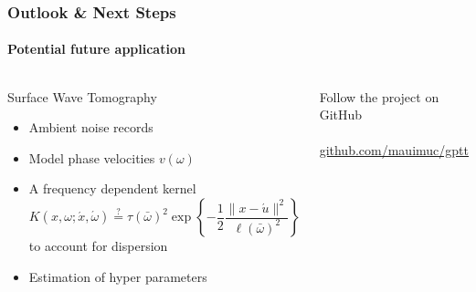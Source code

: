 \documentclass[aspectratio=169, t, 10pt]{beamer}
\begin{document}
\begin{frame}[c]
    \frametitle{Outlook \& Next Steps }
    \framesubtitle{Potential future application}

\begin{columns}
%


    \begin{block}{Surface Wave Tomography}
        \begin{itemize}
            \item Ambient noise records
            \item Model phase velocities $v(\omega)$
            \item A frequency dependent kernel
                \begin{equation}
                    K(x,\omega; \acute x, \acute\omega) \overset{?}{=}
                    \tau(\bar \omega)^2 \exp\left\{ -\frac12 \frac{\|x - \acute u\|^2}{\ell(\bar \omega)^2}\right\}
                \end{equation}
                to account for dispersion
            \item Estimation of hyper parameters
        \end{itemize}
    \end{block}

\vspace{-6mm}
    \begin{center}
        Follow the project on GitHub
        \\[6mm]
        \\[6mm]
        \small
        \href{https://github.com/mauimuc/gptt}{github.com/mauimuc/gptt}
    \end{center}
\end{columns}

\end{frame}
\end{document}
